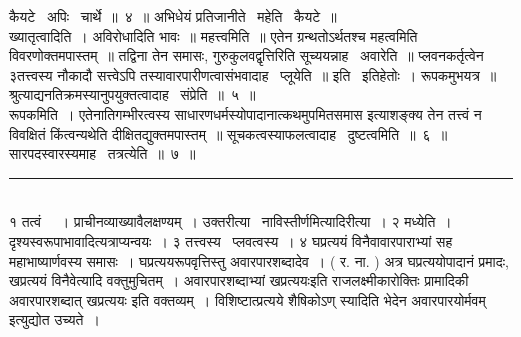 \documentclass[11pt, openany]{book}
\begin{document}
कैयटे \textendash\ अपिः \textendash\ चार्थे~॥~४~॥ अभिधेयं प्रतिजानीते \textendash\ महेति \textendash\ कैयटे~॥\\

ख्यातृत्वादिति~। अविरोधादिति भावः~॥ महत्त्वमिति~॥ एतेन ग्रन्थतोऽर्थतश्च महत्वमिति विवरणोक्तमपास्तम्~॥ तद्विना तेन समासः, गुरुकुलवद्वृत्तिरिति सूच्ययन्नाह \textendash\ अवारेति~॥ प्लवनकर्तृत्वेन ३तत्त्वस्य नौकादौ सत्त्वेऽपि तस्यावारपारीणत्वासंभवादाह \textendash\ प्लूयेति~॥ इति \textendash\ इतिहेतोः~। रूपकमुभयत्र~॥ श्रुत्याद्यनतिक्रमस्यानुपयुक्तत्वादाह \textendash\ संप्रेति~॥~५~॥\\

रूपकमिति~। एतेनातिगम्भीरत्वस्य साधारणधर्मस्योपादानात्कथमुपमितसमास इत्याशङ्क्य तेन तत्त्वं न विवक्षितं किंत्वन्यथेति दीक्षितद्युक्तमपास्तम्~॥ सूचकत्वस्याफलत्वादाह \textendash\ दुष्टत्वमिति~॥~६~॥ सारपदस्वारस्यमाह \textendash\ तत्रत्येति~॥~७~॥

\noindent
\rule{1\linewidth}{0.5pt}\\

१ तत्वं \textendash\ ~। प्राचीनव्याख्यावैलक्षण्यम्~। उक्तरीत्या \textendash\ नाविस्तीर्णमित्यादिरीत्या~। २ मध्येति~। दृश्यस्वरूपाभावादित्यत्राप्यन्वयः~। ३ तत्त्वस्य \textendash\ प्लवत्वस्य~। ४ घप्रत्ययं विनैवावारपाराभ्यां सह महाभाष्यार्णवस्य समासः~। घप्रत्ययरूपवृत्तिस्तु अवारपारशब्दादेव~। ( र. ना. ) अत्र घप्रत्ययोपादानं प्रमादः, खप्रत्ययं विनैवेत्यादि वक्तुमुचितम्~। {\qt अवारपारशब्दाभ्यां खप्रत्ययः}इति राजलक्ष्मीकारोक्तिः प्रामादिकी अवारपारशब्दात् खप्रत्ययः इति वक्तव्यम्~। विशिष्टात्प्रत्यये शैषिकोऽण् स्यादिति भेदेन {\qt अवारपारयोर्मवम्} इत्युद्योत उच्यते~।

\newpage
\end{document}
